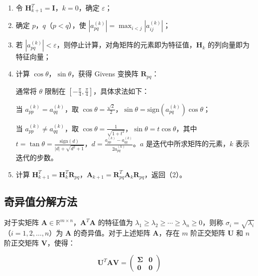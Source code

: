 \begin{enumerate}
    \item 令 \(\mathbf{H}_{k+1}^T = \mathbf{I}\)，\(k = 0\)，确定 \(\varepsilon\)；
    \item 确定 \(p\)，\(q\)（\(p < q\)），使 \(|a_{pq}^{(k)}| = \max_{i < j} |a_{ij}^{(k)}|\)；
    \item 若 \(|a_{pq}^{(k)}| < \varepsilon\)，则停止计算，对角矩阵的元素即为特征值，\(\mathbf{H}_k\) 的列向量即为特征向量；
    \item 计算 \(\cos\theta\)，\(\sin\theta\)，获得 Givens 变换阵 \(\mathbf{R}_{pq}\)：
    
    通常将 \(\theta\) 限制在 \(\left[ -\frac{\pi}{4}, \frac{\pi}{4} \right]\)，具体求法如下：
    
    当 \(a_{pp}^{(k)} = a_{qq}^{(k)}\)，取 \(\cos\theta = \frac{\sqrt{2}}{2}\)，\(\sin\theta = \text{sign}(a_{pq}^{(k)}) \cos\theta\)；
    
    当 \(a_{pp}^{(k)} \neq a_{qq}^{(k)}\)，取 \(\cos\theta = \frac{1}{\sqrt{1 + t^2}}\)，\(\sin\theta = t \cos\theta\)，其中 \(t = \tan\theta = \frac{\text{sign}(d)}{|d| + \sqrt{d^2 + 1}}\)，\(d = \frac{a_{pp}^{(k)} - a_{qq}^{(k)}}{2 a_{pq}^{(k)}}\)。\(a\) 是迭代中所求矩阵的元素，\(k\) 表示迭代的步数。
    \item 计算 \(\mathbf{H}_{k+1}^T = \mathbf{H}_k^T \mathbf{R}_{pq}\)，\(\mathbf{A}_{k+1} = \mathbf{R}_{pq}^T \mathbf{A}_k \mathbf{R}_{pq}\)，返回（2）。
\end{enumerate}

\subsection{奇异值分解方法}

对于实矩阵 \(\mathbf{A} \in \mathbb{R}^{m \times n}\)，\(\mathbf{A}^T \mathbf{A}\) 的特征值为 \(\lambda_1 \geq \lambda_2 \geq \cdots \geq \lambda_n \geq 0\)，则称 \(\sigma_i = \sqrt{\lambda_i}\)（\(i = 1, 2, \ldots, n\)）为 \(\mathbf{A}\) 的奇异值。对于上述矩阵 \(\mathbf{A}\)，存在 \(m\) 阶正交矩阵 \(\mathbf{U}\) 和 \(n\) 阶正交矩阵 \(\mathbf{V}\)，使得：

\begin{equation}
\mathbf{U}^T \mathbf{A} \mathbf{V} = \begin{pmatrix} \mathbf{\Sigma} & \mathbf{0} \\ \mathbf{0} & \mathbf{0} \end{pmatrix} \tag{2-20}
\end{equation}

